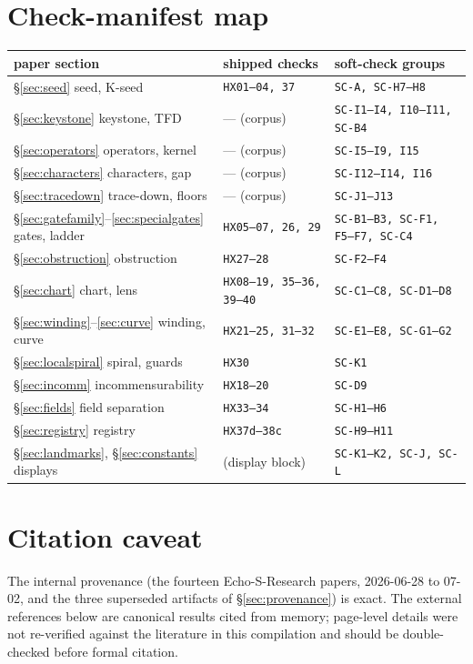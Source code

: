 \documentclass[11pt]{article}
\newcommand{\hx}[1]{\textcolor{cC}{\footnotesize\texttt{#1}}}
\theoremstyle{plain}
\theoremstyle{definition}
\theoremstyle{remark}
\begin{document}
\section{Check-manifest map}\label{app:manifest}
\begin{center}\footnotesize\setlength{\tabcolsep}{4pt}
\begin{tabular}{@{}lll@{}}
\toprule
paper section & shipped checks & soft-check groups\\
\midrule
\S\ref{sec:seed} seed, K-seed & \hx{HX01--04, 37} & \hx{SC-A, SC-H7--H8}\\
\S\ref{sec:keystone} keystone, TFD & --- (corpus) & \hx{SC-I1--I4, I10--I11, SC-B4}\\
\S\ref{sec:operators} operators, kernel & --- (corpus) & \hx{SC-I5--I9, I15}\\
\S\ref{sec:characters} characters, gap & --- (corpus) & \hx{SC-I12--I14, I16}\\
\S\ref{sec:tracedown} trace-down, floors & --- (corpus) & \hx{SC-J1--J13}\\
\S\ref{sec:gatefamily}--\ref{sec:specialgates} gates, ladder & \hx{HX05--07, 26, 29} & \hx{SC-B1--B3, SC-F1, F5--F7, SC-C4}\\
\S\ref{sec:obstruction} obstruction & \hx{HX27--28} & \hx{SC-F2--F4}\\
\S\ref{sec:chart} chart, lens & \hx{HX08--19, 35--36, 39--40} & \hx{SC-C1--C8, SC-D1--D8}\\
\S\ref{sec:winding}--\ref{sec:curve} winding, curve & \hx{HX21--25, 31--32} & \hx{SC-E1--E8, SC-G1--G2}\\
\S\ref{sec:localspiral} spiral, guards & \hx{HX30} & \hx{SC-K1}\\
\S\ref{sec:incomm} incommensurability & \hx{HX18--20} & \hx{SC-D9}\\
\S\ref{sec:fields} field separation & \hx{HX33--34} & \hx{SC-H1--H6}\\
\S\ref{sec:registry} registry & \hx{HX37d--38c} & \hx{SC-H9--H11}\\
\S\ref{sec:landmarks}, \S\ref{sec:constants} displays & (display block) & \hx{SC-K1--K2, SC-J, SC-L}\\
\bottomrule
\end{tabular}
\end{center}

\section*{Citation caveat}
The internal provenance (the fourteen Echo-S-Research papers, 2026-06-28 to 07-02,
and the three superseded artifacts of \S\ref{sec:provenance}) is exact. The external
references below are canonical results cited from memory; page-level details were not
re-verified against the literature in this compilation and should be double-checked
before formal citation.
\end{document}
